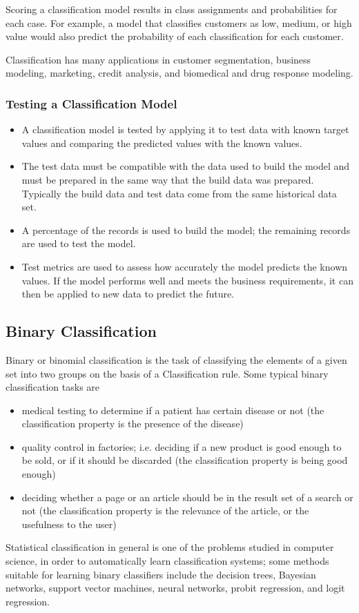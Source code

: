 \documentclass[]{report}
\begin{document}
Scoring a classification model results in class assignments and probabilities for each case. For example, a model that classifies customers as low, medium, or high value would also predict the probability of each classification for each customer.

Classification has many applications in customer segmentation, business modeling, marketing, credit analysis, and biomedical and drug response modeling.

\subsubsection{Testing a Classification Model}
\begin{itemize}
\item A classification model is tested by applying it to test data with known target values and comparing the predicted values with the known values.
\item The test data must be compatible with the data used to build the model and must be prepared in the same way that the build data was prepared. Typically the build data and test data come from the same historical data set. \item A percentage of the records is used to build the model; the remaining records are used to test the model.
\item Test metrics are used to assess how accurately the model predicts the known values. If the model performs well and meets the business requirements, it can then be applied to new data to predict the future.
\end{itemize}

\subsection{Binary Classification}

Binary or binomial classification is the task of classifying the elements of a given set into two groups on the basis of a Classification rule. Some typical binary classification tasks are

\begin{itemize}
\item medical testing to determine if a patient has certain disease or not (the classification property is the presence of the disease)
\item quality control in factories; i.e. deciding if a new product is good enough to be sold, or if it should be discarded (the classification property is being good enough)
\item deciding whether a page or an article should be in the result set of a search or not (the classification property is the relevance of the article, or the usefulness to the user)
\end{itemize}
Statistical classification in general is one of the problems studied in computer science, in order to automatically learn classification systems; some methods suitable for learning binary classifiers include the decision trees, Bayesian networks, support vector machines, neural networks, probit regression, and logit regression.
\end{document}
